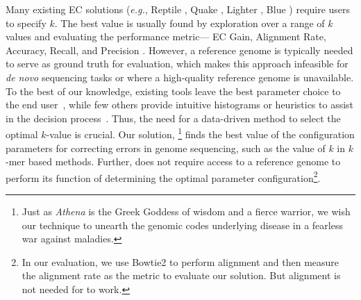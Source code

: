 Many existing EC solutions (\textit{e.g.}, Reptile \cite{yang2010reptile}, Quake \cite{kelley2010quake}, Lighter \cite{song2014lighter}, Blue \cite{greenfield2014blue}) require users to specify $k$. The best value is usually found by exploration over a range of $k$ values \cite{kao2011echo} and evaluating the performance metric--- \eg EC Gain, Alignment Rate, Accuracy, Recall, and Precision \cite{heydari2017evaluation}.
However, a reference genome is typically needed to serve as ground truth for evaluation, which makes this approach infeasible for \textit{de novo} sequencing tasks or where a high-quality reference genome is unavailable. 
To the best of our knowledge, existing tools leave the best parameter choice to the end user~\cite{peng2010idba, mahadik2017scalable}, while few others provide intuitive histograms or heuristics to assist in the decision process~\cite{chikhi2013informed}.
Thus, the need for a data-driven method to select the optimal $k$-value is crucial. 
 
Our solution, {\em \name}\footnote{Just as \textit{Athena} is the Greek Goddess of wisdom and a fierce warrior, we wish our technique to unearth the genomic codes underlying disease in a fearless war against maladies.} finds the best value of the configuration parameters
for correcting errors in genome sequencing, such as the value of $k$ in $k$-mer based methods. Further, \name does not require access to a reference genome to perform its function of determining the optimal parameter configuration\footnote{In our evaluation, we use Bowtie2 to perform alignment and then measure the alignment rate as the metric to evaluate our solution. But alignment is not needed for \name to work.}. 
